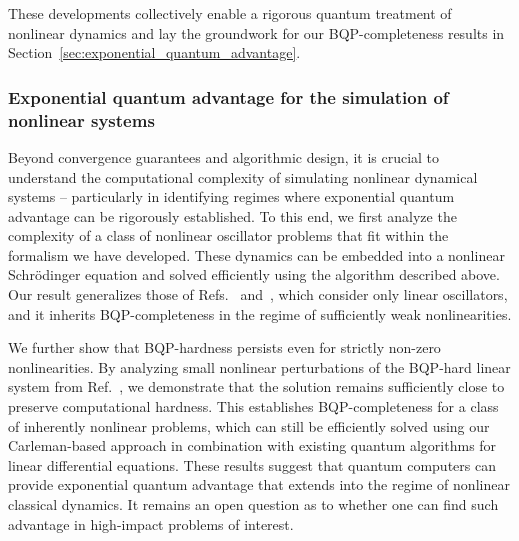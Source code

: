\documentclass[superscriptaddress,onecolumn,nofootinbib,longbibliography,a4paper,accepted=2026-09-29]{quantumarticle}
\theoremstyle{plain}
\theoremstyle{definition}
\numberwithin{thm}{section}
\numberwithin{assumption}{section}
\numberwithin{lemma}{section}
\numberwithin{prop}{section}
\numberwithin{cor}{section}
\numberwithin{definition}{section}
\numberwithin{rmk}{section}
\numberwithin{equation}{section}
\begin{document}
These developments collectively enable a rigorous quantum treatment of nonlinear dynamics and lay the groundwork for our BQP-completeness results in Section~\ref{sec:exponential_quantum_advantage}.


\subsubsection{Exponential quantum advantage for the simulation of nonlinear systems}

Beyond convergence guarantees and algorithmic design, it is crucial to understand the computational complexity of simulating nonlinear dynamical systems -- particularly in identifying regimes where exponential quantum advantage can be rigorously established. To this end, we first analyze the complexity of a class of nonlinear oscillator problems that fit within the formalism we have developed. These dynamics can be embedded into a nonlinear Schr\"{o}dinger equation and solved efficiently using the algorithm described above. Our result generalizes those of Refs.~\cite{babbush2023exponential} and~\cite{krovi2024quantum}, which consider only linear oscillators, and it inherits BQP-completeness in the regime of sufficiently weak nonlinearities.

We further show that BQP-hardness persists even for strictly non-zero nonlinearities. By analyzing small nonlinear perturbations of the BQP-hard linear system from Ref.~\cite{babbush2023exponential}, we demonstrate that the solution remains sufficiently close to preserve computational hardness. This establishes BQP-completeness for a class of inherently nonlinear problems, which can still be efficiently solved using our Carleman-based approach in combination with existing quantum algorithms for linear differential equations. These results suggest that quantum computers can provide exponential quantum advantage that extends into the regime of nonlinear classical dynamics. It remains an open question as to whether one can find such advantage in high-impact problems of interest.

\end{document}
